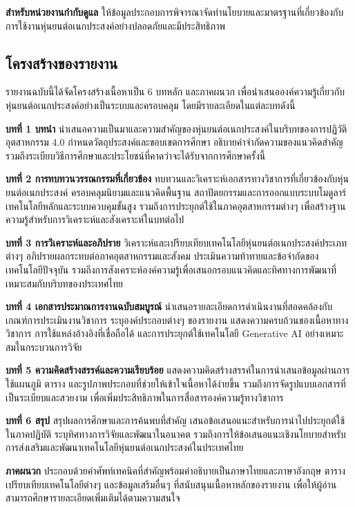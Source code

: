 \documentclass[a4paper]{article}
\begin{document}
\textbf{สำหรับหน่วยงานกำกับดูแล} ให้ข้อมูลประกอบการพิจารณาจัดทำนโยบายและมาตรฐานที่เกี่ยวข้องกับการใช้งานหุ่นยนต์อเนกประสงค์อย่างปลอดภัยและมีประสิทธิภาพ
\subsection{โครงสร้างของรายงาน}

รายงานฉบับนี้ได้จัดโครงสร้างเนื้อหาเป็น 6 บทหลัก และภาคผนวก เพื่อนำเสนอองค์ความรู้เกี่ยวกับหุ่นยนต์อเนกประสงค์อย่างเป็นระบบและครอบคลุม โดยมีรายละเอียดในแต่ละบทดังนี้

\textbf{บทที่ 1 บทนำ} นำเสนอความเป็นมาและความสำคัญของหุ่นยนต์อเนกประสงค์ในบริบทของการปฏิวัติอุตสาหกรรม 4.0 กำหนดวัตถุประสงค์และขอบเขตการศึกษา อธิบายคำจำกัดความของแนวคิดสำคัญ รวมถึงระเบียบวิธีการศึกษาและประโยชน์ที่คาดว่าจะได้รับจากการศึกษาครั้งนี้

\textbf{บทที่ 2 การทบทวนวรรณกรรมที่เกี่ยวข้อง} ทบทวนและวิเคราะห์เอกสารทางวิชาการที่เกี่ยวข้องกับหุ่นยนต์อเนกประสงค์ ครอบคลุมนิยามและแนวคิดพื้นฐาน สถาปัตยกรรมและการออกแบบระบบโมดูลาร์ เทคโนโลยีหลักและระบบควบคุมขั้นสูง รวมถึงการประยุกต์ใช้ในภาคอุตสาหกรรมต่างๆ เพื่อสร้างฐานความรู้สำหรับการวิเคราะห์และสังเคราะห์ในบทต่อไป

\textbf{บทที่ 3 การวิเคราะห์และอภิปราย} วิเคราะห์และเปรียบเทียบเทคโนโลยีหุ่นยนต์อเนกประสงค์ประเภทต่างๆ อภิปรายผลกระทบต่อภาคอุตสาหกรรมและสังคม ประเมินความท้าทายและข้อจำกัดของเทคโนโลยีปัจจุบัน รวมถึงการสังเคราะห์องค์ความรู้เพื่อเสนอกรอบแนวคิดและทิศทางการพัฒนาที่เหมาะสมกับบริบทของประเทศไทย

\textbf{บทที่ 4 เอกสารประมาณการงานฉบับสมบูรณ์} นำเสนอรายละเอียดการดำเนินงานที่สอดคล้องกับเกณฑ์การประเมินงานวิชาการ ระบุองค์ประกอบต่างๆ ของรายงาน แสดงความครบถ้วนของเนื้อหาทางวิชาการ การใช้แหล่งอ้างอิงที่เชื่อถือได้ และการประยุกต์ใช้เทคโนโลยี Generative AI อย่างเหมาะสมในกระบวนการวิจัย

\textbf{บทที่ 5 ความคิดสร้างสรรค์และความเรียบร้อย} แสดงความคิดสร้างสรรค์ในการนำเสนอข้อมูลผ่านการใช้แผนภูมิ ตาราง และรูปภาพประกอบที่ช่วยให้เข้าใจเนื้อหาได้ง่ายขึ้น รวมถึงการจัดรูปแบบเอกสารที่เป็นระเบียบและสวยงาม เพื่อเพิ่มประสิทธิภาพในการสื่อสารองค์ความรู้ทางวิชาการ

\textbf{บทที่ 6 สรุป} สรุปผลการศึกษาและการค้นพบที่สำคัญ เสนอข้อเสนอแนะสำหรับการนำไปประยุกต์ใช้ในภาคปฏิบัติ ระบุทิศทางการวิจัยและพัฒนาในอนาคต รวมถึงการให้ข้อเสนอแนะเชิงนโยบายสำหรับการส่งเสริมและพัฒนาเทคโนโลยีหุ่นยนต์อเนกประสงค์ในประเทศไทย

\textbf{ภาคผนวก} ประกอบด้วยคำศัพท์เทคนิคที่สำคัญพร้อมคำอธิบายเป็นภาษาไทยและภาษาอังกฤษ ตารางเปรียบเทียบเทคโนโลยีต่างๆ และข้อมูลเสริมอื่นๆ ที่สนับสนุนเนื้อหาหลักของรายงาน เพื่อให้ผู้อ่านสามารถศึกษารายละเอียดเพิ่มเติมได้ตามความสนใจ
\end{document}

